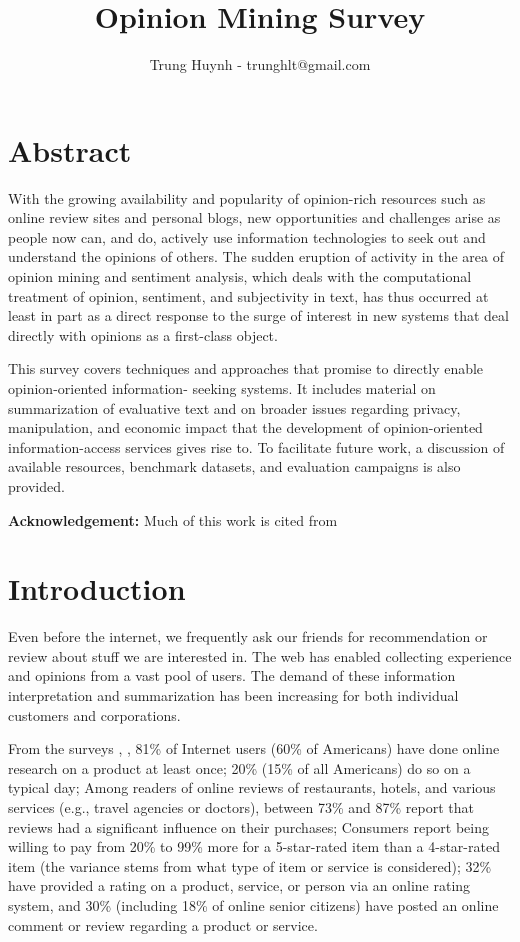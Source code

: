 \documentclass{article}
\title{\textbf{Opinion Mining Survey}}
\author{Trung Huynh - trunghlt@gmail.com}\date{}
\begin{document}
\maketitle
\thispagestyle{fancy}

\begin{multicols}{2}
 

\section{Abstract}
    With the growing availability and popularity 
of opinion-rich resources such as online review sites and personal blogs, new 
opportunities and challenges arise as people now can, and do, actively use 
information technologies to seek out and understand the opinions of others. The 
sudden eruption of activity in the area of opinion mining and sentiment analysis, 
which deals with the computational treatment of opinion, sentiment, and 
subjectivity in text, has thus occurred at least in part as a direct response to 
the surge of interest in new systems that deal directly with opinions as a 
first-class object.

This survey covers techniques and approaches that promise to directly enable 
opinion-oriented information- seeking systems. It includes material on summarization 
of evaluative text and on broader issues regarding privacy, manipulation, and 
economic impact that the development of opinion-oriented information-access services 
gives rise to. To facilitate future work, a discussion of available resources, 
benchmark datasets, and evaluation campaigns is also provided.

   \textbf{Acknowledgement:} Much of this work is cited from \citet{Pang2008}

\section{Introduction}
    Even before the internet, we frequently ask our friends for recommendation
or review about stuff we are interested in. The web has enabled collecting 
experience and opinions from a vast pool of users. The demand of these 
information interpretation and summarization has been increasing for both
individual customers and corporations.

    From the surveys \citet{comScore2007}, \citet{Horrigan2008}, 81\% of Internet 
users (60\% of Americans) have done online research on a product at least once;
20\% (15\% of all Americans) do so on a typical day; Among readers of online 
reviews of restaurants, hotels, and various services (e.g., travel agencies or 
doctors), between 73\% and 87\% report that reviews had a significant influence 
on their purchases; Consumers report being willing to pay from 20\% to 99\% more for
a 5-star-rated item than a 4-star-rated item (the variance stems from what
type of item or service is considered); 32\% have provided a rating on a product, 
service, or person via an online rating system, and 30\% (including 18\% of 
online senior citizens) have posted an online comment or review regarding a 
product or service.


\end{multicols}
\end{document}
